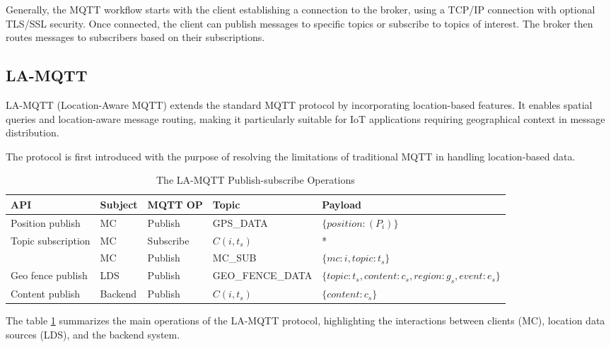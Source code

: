 Generally, the MQTT workflow starts with the client establishing a connection to the broker, using a TCP/IP connection with optional TLS/SSL security. Once connected, the client can publish messages to specific topics or subscribe to topics of interest. The broker then routes messages to subscribers based on their subscriptions.

\subsection{LA-MQTT} \label{sec:la-mqtt}
LA-MQTT (Location-Aware MQTT) extends the standard MQTT protocol by incorporating location-based features. It enables spatial queries and location-aware message routing, making it particularly suitable for IoT applications requiring geographical context in message distribution.

The protocol is first introduced with the purpose of resolving the limitations of traditional MQTT in handling location-based data\cite{montori2022lamqtt}.

\begin{table}[h]
\small
\begin{tabularx}{\linewidth}{|l|X|X|X|p{4cm}|}
\hline
\textbf{API} & \textbf{Subject} & \textbf{MQTT OP} & \textbf{Topic} & \textbf{Payload} \\ \hline
Position publish & MC & Publish & GPS\_DATA & $\{position: ( P_i )\}$ \\ \hline
Topic subscription & MC & Subscribe & $C(i, t_s)$ & * \\ \cline{2-5}
 & MC & Publish & MC\_SUB & $\{ mc: i, topic: t_s \}$ \\ \hline
Geo fence publish & LDS & Publish & GEO\_FENCE\_DATA & $\{topic: t_s, content: c_s, $\newline$region: g_s, event: e_s\}$ \\ \hline
Content publish & Backend & Publish & $C(i, t_s)$ & $\{content: c_s\}$ \\ \hline
\end{tabularx}
\caption{The LA-MQTT Publish-subscribe Operations}
\label{table:la-mqtt}
\end{table}

The table \ref{table:la-mqtt} summarizes the main operations of the LA-MQTT protocol, highlighting the interactions between clients (MC), location data sources (LDS), and the backend system.

